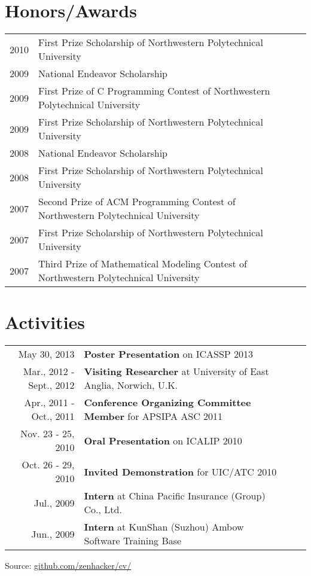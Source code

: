 \documentclass[10pt]{article}
\begin{document}

\vspace{0.8em}
\section{Honors/Awards}
\begin{tabularx}{\textwidth}{@{}r|X l|p{4.9cm}@{}}
2010 & First Prize Scholarship of Northwestern Polytechnical University \\
2009 & National Endeavor Scholarship \\
2009 & First Prize of C Programming Contest of Northwestern Polytechnical University \\
2009 & First Prize Scholarship of Northwestern Polytechnical University \\
2008 & National Endeavor Scholarship \\
2008 & First Prize Scholarship of Northwestern Polytechnical University \\
2007 & Second Prize of ACM Programming Contest of Northwestern Polytechnical University \\
2007 & First Prize Scholarship of Northwestern Polytechnical University \\
2007 & Third Prize of Mathematical Modeling Contest of Northwestern Polytechnical University
\end{tabularx}



\vspace{0.8em}
\section{Activities}
\begin{tabularx}{\textwidth}{@{}r|X l|p{4.9cm}@{}}
May 30, 2013             &  \textbf{Poster Presentation} on ICASSP 2013 \\
Mar., 2012 - Sept., 2012 &  \textbf{Visiting Researcher} at University of East Anglia, Norwich, U.K. \\
Apr., 2011 - Oct., 2011  &  \textbf{Conference Organizing Committee Member} for APSIPA ASC 2011 \\
Nov. 23 - 25, 2010       &  \textbf{Oral Presentation} on ICALIP 2010 \\
Oct. 26 - 29, 2010       &  \textbf{Invited Demonstration} for UIC/ATC 2010 \\
Jul., 2009               &  \textbf{Intern} at China Pacific Insurance (Group) Co., Ltd. \\
Jun., 2009               &  \textbf{Intern} at KunShan (Suzhou) Ambow Software Training Base
\end{tabularx}



\null\vfill
\footnotesize{
  Source:  \href{https://github.com/zenhacker/cv}{github.com/zenhacker/cv/}
}

\pagestyle{myheadings}

\end{document}
